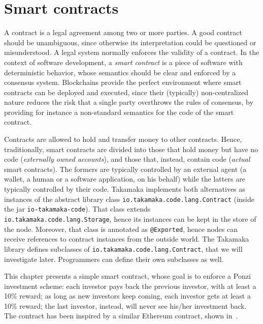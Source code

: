 \chapter{Smart contracts}\label{ch:smart_contracts}

A contract is a legal agreement among two or more parties. A good contract
should be unambiguous, since otherwise its interpretation could be
questioned or misunderstood. A legal system normally enforces the
validity of a contract. In the context of software development,
a \emph{smart contract}
is a piece of software with deterministic behavior, whose semantics should be
clear and enforced by a consensus system. Blockchains provide the perfect
environment where smart contracts can be deployed and executed, since their
(typically) non-centralized nature reduces the risk that a single party
overthrows the rules of consensus, by providing for instance a non-standard
semantics for the code of the smart contract.

Contracts are allowed to hold and transfer money to other contracts. Hence,
traditionally, smart contracts are divided into those that hold money
but have no code (\emph{externally owned accounts}), and those that,
instead, contain code (\emph{actual} smart contracts).
The formers are typically controlled by an external agent (a wallet,
a human or a software application, on his behalf)
while the latters are typically controlled by their code.
Takamaka implements both alternatives as instances of the abstract library class
\texttt{io.takamaka.code.lang.Contract}
(inside the jar \texttt{io-takamaka-code}). That class extends
\texttt{io.takamaka.code.lang.Storage}, hence its instances can be kept in the store
of the node. Moreover, that class is annotated as \texttt{@Exported}, hence nodes can receive
references to contract instances from the outside world.
The Takamaka library defines subclasses of \texttt{io.takamaka.code.lang.Contract}, that
we will investigate later. Programmers can define their own subclasses as well.

This chapter presents a simple smart contract, whose goal is to
enforce a Ponzi investment scheme: each investor pays back the previous investor,
with at least a 10\% reward; as long as new
investors keep coming, each investor gets at least a 10\% reward; the last
investor, instead, will never see his/her investment back.
The contract has been inspired by a similar Ethereum contract, shown
in~\cite{IyerD18}.

